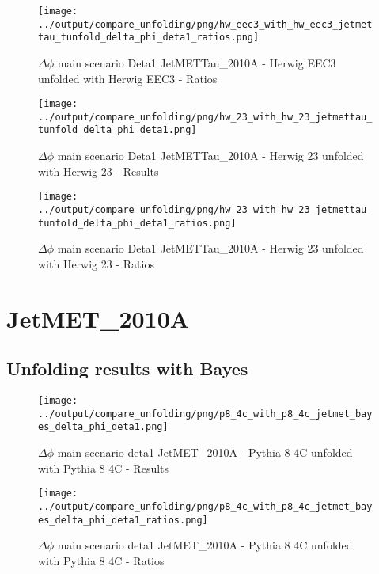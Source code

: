 \documentclass[11pt]{book}
\begin{document}
\begin{figure}[ht]
\centering
\texttt{[image: ../output/compare\_unfolding/png/hw\_eec3\_with\_hw\_eec3\_jetmettau\_tunfold\_delta\_phi\_deta1\_ratios.png]}
\caption{$\Delta\phi$ main scenario Deta1 JetMETTau\_2010A - Herwig EEC3 unfolded with Herwig EEC3 - Ratios}
\label{hw_eec3_hw_eec3_jetmettau_tunfold_delta_phi_deta1_b}
\end{figure}

\begin{figure}[ht]
\centering
\texttt{[image: ../output/compare\_unfolding/png/hw\_23\_with\_hw\_23\_jetmettau\_tunfold\_delta\_phi\_deta1.png]}
\caption{$\Delta\phi$ main scenario Deta1 JetMETTau\_2010A - Herwig 23 unfolded with Herwig 23 - Results}
\label{hw_23_hw_23_jetmettau_tunfold_delta_phi_deta1_a}
\end{figure}

\begin{figure}[ht]
\centering
\texttt{[image: ../output/compare\_unfolding/png/hw\_23\_with\_hw\_23\_jetmettau\_tunfold\_delta\_phi\_deta1\_ratios.png]}
\caption{$\Delta\phi$ main scenario Deta1 JetMETTau\_2010A - Herwig 23 unfolded with Herwig 23 - Ratios}
\label{hw_23_hw_23_jetmettau_tunfold_delta_phi_deta1_b}
\end{figure}


\clearpage
\section{JetMET\_2010A}
\subsection{Unfolding results with Bayes}

\begin{figure}[ht]
\centering
\texttt{[image: ../output/compare\_unfolding/png/p8\_4c\_with\_p8\_4c\_jetmet\_bayes\_delta\_phi\_deta1.png]}
\caption{$\Delta\phi$ main scenario deta1 JetMET\_2010A - Pythia 8 4C unfolded with Pythia 8 4C - Results}
\label{p8_p8_jetmet_bayes_delta_phi_deta1_a}
\end{figure}

\begin{figure}[ht]
\centering
\texttt{[image: ../output/compare\_unfolding/png/p8\_4c\_with\_p8\_4c\_jetmet\_bayes\_delta\_phi\_deta1\_ratios.png]}
\caption{$\Delta\phi$ main scenario deta1 JetMET\_2010A - Pythia 8 4C unfolded with Pythia 8 4C - Ratios}
\label{p8_p8_jetmet_bayes_delta_phi_deta1_b}
\end{figure}
\end{document}
